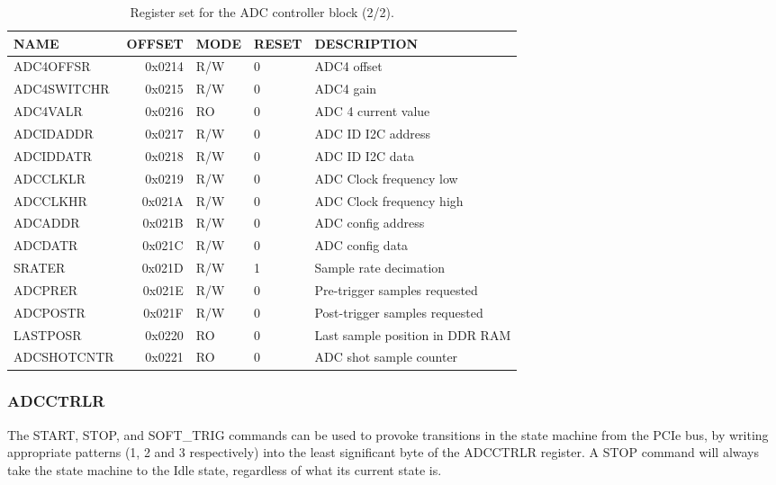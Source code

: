 \documentclass{article}
\begin{document}
\begin{table}[htbp]
  \centering
  \begin{tabularx}{\textwidth}{|l|r|l|l|X|}
    \hline
    \textbf{NAME} & \textbf{OFFSET} & \textbf{MODE} & \textbf{RESET} & \textbf{DESCRIPTION} \\
    \hline
    \hline
    ADC4OFFSR & 0x0214 & R/W & 0 & ADC4 offset \\
    \hline
    ADC4SWITCHR & 0x0215 & R/W & 0 & ADC4 gain \\
    \hline
    ADC4VALR & 0x0216 & RO & 0 & ADC 4 current value \\
    \hline
    ADCIDADDR & 0x0217 & R/W & 0 & ADC ID I2C address \\
    \hline
    ADCIDDATR & 0x0218 & R/W & 0 & ADC ID I2C data \\
    \hline
    ADCCLKLR & 0x0219 & R/W & 0 & ADC Clock frequency low \\
    \hline
    ADCCLKHR & 0x021A & R/W & 0 & ADC Clock frequency high \\
    \hline
    ADCADDR & 0x021B & R/W & 0 & ADC config address \\
    \hline
    ADCDATR & 0x021C & R/W & 0 & ADC config data \\
    \hline
    SRATER & 0x021D & R/W & 1 & Sample rate decimation \\
    \hline
    ADCPRER & 0x021E & R/W & 0 & Pre-trigger samples requested \\
    \hline
    ADCPOSTR & 0x021F & R/W & 0 & Post-trigger samples requested \\
    \hline
    LASTPOSR & 0x0220 & RO & 0 & Last sample position in DDR RAM\\
    \hline
    ADCSHOTCNTR & 0x0221 & RO & 0 & ADC shot sample counter \\
    \hline
  \end{tabularx}
  \caption{Register set for the ADC controller block (2/2).}
  \label{tab:adc_control2}
\end{table}

\subsubsection{ADCCTRLR}
The START, STOP, and SOFT\_TRIG commands can be used to provoke transitions in the state machine from the PCIe bus, by writing appropriate patterns (1, 2 and 3 respectively) into the least significant byte of the ADCCTRLR register. A STOP command will always take the state machine to the Idle state, regardless of what its current state is.
\end{document}
